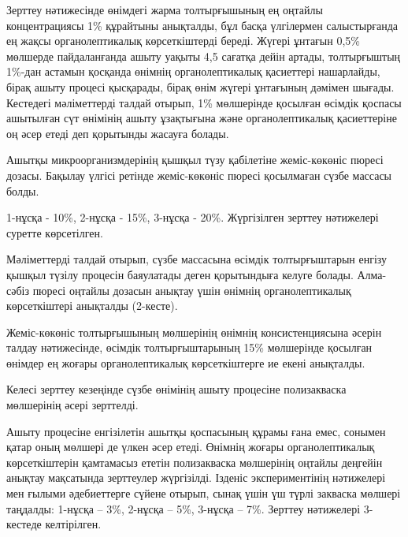 \begin{multicols}{2}
Зерттеу нәтижесінде өнімдегі жарма толтырғышының ең оңтайлы
концентрациясы 1\% құрайтыны анықталды, бұл басқа үлгілермен
салыстырғанда ең жақсы органолептикалық көрсеткіштерді береді. Жүгері
ұнтағын 0,5\% мөлшерде пайдаланғанда ашыту уақыты 4,5 сағатқа дейін
артады, толтырғыштың 1\%-дан астамын қосқанда өнімнің органолептикалық
қасиеттері нашарлайды, бірақ ашыту процесі қысқарады, бірақ өнім жүгері
ұнтағының дәмімен шығады. Кестедегі мәліметтерді талдай отырып, 1\%
мөлшерінде қосылған өсімдік қоспасы ашытылған сүт өнімінің ашыту
ұзақтығына және органолептикалық қасиеттеріне оң әсер етеді деп
қорытынды жасауға болады.

Ашытқы микроорганизмдерінің қышқыл түзу қабілетіне жеміс-көкөніс пюресі
дозасы. Бақылау үлгісі ретінде жеміс-көкөніс пюресі қосылмаған сүзбе
массасы болды.

1-нұсқа - 10\%, 2-нұсқа - 15\%, 3-нұсқа - 20\%. Жүргізілген зерттеу
нәтижелері суретте көрсетілген.

Мәліметтерді талдай отырып, сүзбе массасына өсімдік толтырғыштарын
енгізу қышқыл түзілу процесін баяулатады деген қорытындыға келуге
болады. Алма-сәбіз пюресі оңтайлы дозасын анықтау үшін өнімнің
органолептикалық көрсеткіштері анықталды (2-кесте).

Жеміс-көкөніс толтырғышының мөлшерінің өнімнің консистенциясына әсерін
талдау нәтижесінде, өсімдік толтырғыштарының 15\% мөлшерінде қосылған
өнімдер ең жоғары органолептикалық көрсеткіштерге ие екені анықталды.

Келесі зерттеу кезеңінде сүзбе өнімінің ашыту процесіне полизакваска
мөлшерінің әсері зерттелді.

Ашыту процесіне енгізілетін ашытқы қоспасының құрамы ғана емес, сонымен
қатар оның мөлшері де үлкен әсер етеді. Өнімнің жоғары органолептикалық
көрсеткіштерін қамтамасыз ететін полизакваска мөлшерінің оңтайлы
деңгейін анықтау мақсатында зерттеулер жүргізілді. Ізденіс
экспериментінің нәтижелері мен ғылыми әдебиеттерге сүйене отырып, сынақ
үшін үш түрлі закваска мөлшері таңдалды: 1-нұсқа -- 3\%, 2-нұсқа -- 5\%,
3-нұсқа -- 7\%. Зерттеу нәтижелері 3-кестеде келтірілген.
\end{multicols}

